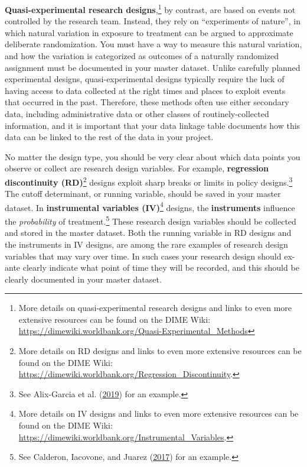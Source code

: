 \documentclass[
]{book}
\begin{document}
\textbf{Quasi-experimental research designs},\footnote{More details on quasi-experimental research designs
  and links to even more extensive resources
  can be found on the DIME Wiki:
  \url{https://dimewiki.worldbank.org/Quasi-Experimental_Methods}}
by contrast, are based on events not controlled by the research team.
Instead, they rely on ``experiments of nature'',
in which natural variation in exposure to treatment
can be argued to approximate deliberate randomization.
You must have a way to measure this natural variation,
and how the variation is categorized as outcomes of a naturally randomized assignment
must be documented in your master dataset.
Unlike carefully planned experimental designs,
quasi-experimental designs typically require the luck
of having access to data collected at the right times and places
to exploit events that occurred in the past.
Therefore, these methods often use either secondary data,
including administrative data or other classes of routinely-collected information,
and it is important that your data linkage table documents
how this data can be linked to the rest of the data in your project.

No matter the design type, you should be very clear about
which data points you observe or collect are research design variables.
For example,
\textbf{regression discontinuity (RD)}\footnote{More details on RD designs
  and links to even more extensive resources
  can be found on the DIME Wiki:
  \url{https://dimewiki.worldbank.org/Regression_Discontinuity}.}
designs exploit sharp breaks or limits
in policy designs.\footnote{See Alix-Garcia et al. (\protect\hyperlink{ref-alix2019can}{2019}) for an example.}
The cutoff determinant, or running variable,
should be saved in your master dataset.
In \textbf{instrumental variables (IV)}\footnote{More details on IV designs
  and links to even more extensive resources
  can be found on the DIME Wiki:
  \url{https://dimewiki.worldbank.org/Instrumental_Variables}.}
designs, the \textbf{instruments} influence the \emph{probability} of treatment.\footnote{See Calderon, Iacovone, and Juarez (\protect\hyperlink{ref-calderon2017opportunity}{2017}) for an example.}
These research design variables should be collected
and stored in the master dataset.
Both the running variable in RD designs
and the instruments in IV designs,
are among the rare examples of research design variables
that may vary over time.
In such cases your research design should
ex-ante clearly indicate what point of time they will be recorded,
and this should be clearly documented in your master dataset.
\end{document}
